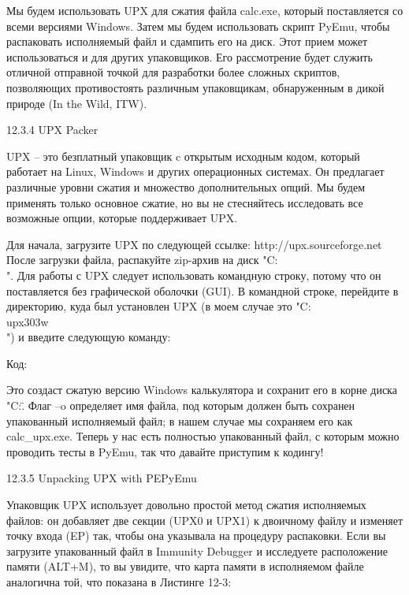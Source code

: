 \documentclass[12pt]{book}
\begin{document}
Мы будем использовать UPX для сжатия файла calc.exe, который поставляется со всеми версиями Windows. Затем мы будем использовать скрипт PyEmu, чтобы распаковать исполняемый файл и сдампить его на диск. Этот прием может использоваться и для других упаковщиков. Его рассмотрение будет служить отличной отправной точкой для разработки более сложных скриптов, позволяющих противостоять различным упаковщикам, обнаруженным в дикой природе (In the Wild, ITW). 

12.3.4 UPX Packer

UPX – это безплатный упаковщик c открытым исходным кодом, который работает на Linux, Windows и других операционных системах. Он предлагает различные уровни сжатия и множество дополнительных опций. Мы будем применять только основное сжатие, но вы не стесняйтесь исследовать все возможные опции, которые поддерживает UPX. 

Для начала, загрузите UPX по следующей ссылке: 
http://upx.sourceforge.net
После загрузки файла, распакуйте zip-архив на диск "C:\\". Для работы с UPX следует использовать командную строку, потому что он поставляется без графической оболочки (GUI). В командной строке, перейдите в директорию, куда был установлен UPX (в моем случае это "C:\\upx303w\\") и введите следующую команду:

Код:



Это создаст сжатую версию Windows калькулятора и сохранит его в корне диска "C:\". Флаг –o определяет имя файла, под которым должен быть сохранен упакованный исполняемый файл; в нашем случае мы сохраняем его как calc\_upx.exe. Теперь у нас есть полностью упакованный файл, с которым можно проводить тесты в PyEmu, так что давайте приступим к кодингу!

12.3.5 Unpacking UPX with PEPyEmu

Упаковщик UPX использует довольно простой метод сжатия исполняемых файлов: он добавляет две секции (UPX0 и UPX1) к двоичному файлу и изменяет точку входа (EP) так, чтобы она указывала на процедуру распаковки. Если вы загрузите упакованный файл в Immunity Debugger и исследуете расположение памяти (ALT+M), то вы увидите, что карта памяти в исполняемом файле аналогична той, что показана в Листинге 12-3:
\end{document}
